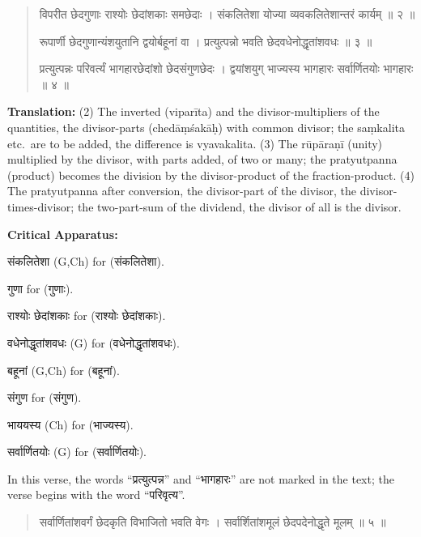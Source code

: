 \documentclass[11pt,a4paper]{article}
\newcommand{\dev}[1]{{\devanagarifont #1}}
\newenvironment{sanskritverse}{%
  \begin{quote}%
  \devanagarifont%
  \setlength{\leftmargin}{2em}%
}{\end{quote}}
\newenvironment{variants}{%
  \small%
  \color{varecolor}%
  \list{}{\leftmargin=2em\itemindent=-1em}%
}{\endlist}
\begin{document}
\begin{sanskritverse}
\dev{विपरीत छेदगुणाः राश्योः छेदांशकाः समछेदाः} ।
\dev{संकलितेशा योज्या व्यवकलितेशान्तरं कार्यम् ॥ २ ॥}

\dev{रूपार्णी छेदगुणान्यंशयुतानि द्वयोर्बहूनां वा} ।
\dev{प्रत्युत्पन्नो भवति छेदवधेनोद्धृतांशवधः ॥ ३ ॥}

\dev{प्रत्युत्पन्नः परिवर्त्यं भागहारछेदांशो छेदसंगुणछेदः} ।
\dev{द्वयांशयुग् भाज्यस्य भागहारः सर्वार्णितयोः भागहारः ॥ ४ ॥}
\end{sanskritverse}

\textbf{Translation:} (2) The inverted (viparīta) and the divisor-multipliers of 
the quantities, the divisor-parts (chedāṃśakāḥ) with common divisor; the saṃkalita 
etc.\ are to be added, the difference is vyavakalita. (3) The rūpāraṇī (unity) 
multiplied by the divisor, with parts added, of two or many; the pratyutpanna 
(product) becomes the division by the divisor-product of the fraction-product. 
(4) The pratyutpanna after conversion, the divisor-part of the divisor, the 
divisor-times-divisor; the two-part-sum of the dividend, the divisor of all 
is the divisor.

\textcolor{varecolor}{\textbf{Critical Apparatus:}}
\begin{variants}
\item[2.1] \dev{संकलितेशा} (G,Ch) \dev{for} (\dev{संकलितेशा}).
\item[2.2] \dev{गुणा} \dev{for} (\dev{गुणाः}).
\item[2.3] \dev{राश्योः छेदांशकाः} \dev{for} (\dev{राश्योः छेदांशकाः}).
\item[3.1] \dev{वधेनोद्धृतांशवधः} (G) \dev{for} (\dev{वधेनोद्धृतांशवधः}).
\item[3.2] \dev{बहूनां} (G,Ch) \dev{for} (\dev{बहूनां}).
\item[4.1] \dev{संगुण} \dev{for} (\dev{संगुण}).
\item[4.2] \dev{भाययस्य} (Ch) \dev{for} (\dev{भाज्यस्य}).
\item[4.3] \dev{सर्वार्णितयोः} (G) \dev{for} (\dev{सर्वार्णितयोः}).
\item[\dev{वि०}] In this verse, the words ``\dev{प्रत्युत्पन्न}'' and ``\dev{भागहारः}'' 
are not marked in the text; the verse begins with the word ``\dev{परिवृत्य}''.
\end{variants}

\begin{sanskritverse}
\dev{सर्वार्णितांशवर्गं छेदकृति विभाजितो भवति वेगः} ।
\dev{सर्वार्शितांशमूलं छेदपदेनोद्धृते मूलम् ॥ ५ ॥}
\end{sanskritverse}
\end{document}

